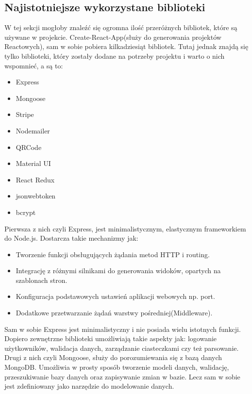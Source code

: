\documentclass[12pt]{article}
\begin{document}
\begin{sloppypar}
{  \subsection{Najistotniejsze wykorzystane biblioteki}
  \label{section:most-important-libraries}
  {
    W tej sekcji mogłoby znaleźć się ogromna ilość przeróżnych bibliotek, które są używane w projekcie. Create-React-App(służy do generowania projektów Reactowych), 
    sam w sobie pobiera kilkadziesiąt bibliotek. Tutaj jednak znajdą się tylko biblioteki, który zostały dodane na potrzeby projektu i warto o nich wspomnieć, a są to:
    \begin{itemize}
      \item Express
      \item Mongoose
      \item Stripe
      \item Nodemailer
      \item QRCode
      \item Material UI
      \item React Redux
      \item jsonwebtoken
      \item bcrypt
    \end{itemize}
    Pierwsza z nich czyli Express, jest minimalistycznym, elastycznym frameworkiem do Node.js. Dostarcza takie mechanizmy jak\cite{express}:
    \begin{itemize}
      \item Tworzenie funkcji obsługujących żądania metod HTTP i routing.
      \item Integrację z różnymi silnikami do generowania widoków, opartych na szablonach stron.
      \item Konfiguracja podstawowych ustawień aplikacji webowych np. port.
      \item Dodatkowe przetwarzanie żądań warstwy pośredniej(Middleware).
    \end{itemize}
    Sam w sobie Express jest minimalistyczny i nie posiada wielu istotnych funkcji. Dopiero zewnętrzne biblioteki umożliwiają takie aspekty jak: logowanie użytkowników,
    walidacja danych, zarządzanie ciasteczkami czy też parsowanie.\\
 
    Drugi z nich czyli Mongoose, służy do porozumiewania się z bazą danych MongoDB. Umożliwia w prosty sposób tworzenie modeli danych, walidację, przeszukiwanie bazy danych 
    oraz zapisywanie zmian w bazie. Lecz sam w sobie jest zdefiniowany jako narzędzie do modelowanie danych.\\
 
}}
\end{sloppypar}
\end{document}
